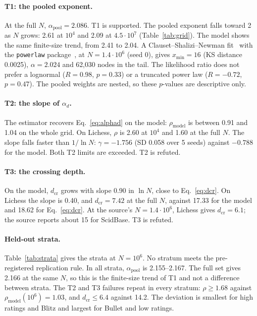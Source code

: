 \documentclass[11pt]{article}
\begin{document}
\paragraph{T1: the pooled exponent.} At the full $N$, $\alpha_{\mathrm{pool}}=2.086$. T1 is supported. The pooled exponent falls toward 2 as $N$ grows: 2.61 at $10^4$ and 2.09 at $4.5\cdot10^7$ (Table~\ref{tab:grid}). The model shows the same finite-size trend, from 2.41 to 2.04. A Clauset--Shalizi--Newman fit~\cite{csn} with the \texttt{powerlaw} package~\cite{powerlaw}, at $N=1.4\cdot10^6$ (seed 0), gives $x_{\min}=16$ (KS distance 0.0025), $\alpha=2.024$ and 62,030 nodes in the tail. The likelihood ratio does not prefer a lognormal ($R=0.98$, $p=0.33$) or a truncated power law ($R=-0.72$, $p=0.47$). The pooled weights are nested, so these $p$-values are descriptive only.

\paragraph{T2: the slope of $\alpha_d$.} The estimator recovers Eq.~\eqref{eq:alphad} on the model: $\rho_{\mathrm{model}}$ is between 0.91 and 1.04 on the whole grid. On Lichess, $\rho$ is 2.60 at $10^4$ and 1.60 at the full $N$. The slope falls faster than $1/\ln N$: $\gamma=-1.756$ (SD 0.058 over 5 seeds) against $-0.788$ for the model. Both T2 limits are exceeded. T2 is refuted.

\paragraph{T3: the crossing depth.} On the model, $d_{\mathrm{cr}}$ grows with slope 0.90 in $\ln N$, close to Eq.~\eqref{eq:dcr}. On Lichess the slope is 0.40, and $d_{\mathrm{cr}}=7.42$ at the full $N$, against 17.33 for the model and 18.62 for Eq.~\eqref{eq:dcr}. At the source's $N=1.4\cdot10^6$, Lichess gives $d_{\mathrm{cr}}=6.1$; the source reports about 15 for ScidBase. T3 is refuted.

\paragraph{Held-out strata.} Table~\ref{tab:strata} gives the strata at $N=10^6$. No stratum meets the pre-registered replication rule. In all strata, $\alpha_{\mathrm{pool}}$ is 2.155--2.167. The full set gives 2.166 at the same $N$, so this is the finite-size trend of T1 and not a difference between strata. The T2 and T3 failures repeat in every stratum: $\rho\ge1.68$ against $\rho_{\mathrm{model}}(10^6)=1.03$, and $d_{\mathrm{cr}}\le6.4$ against 14.2. The deviation is smallest for high ratings and Blitz and largest for Bullet and low ratings.
\end{document}
